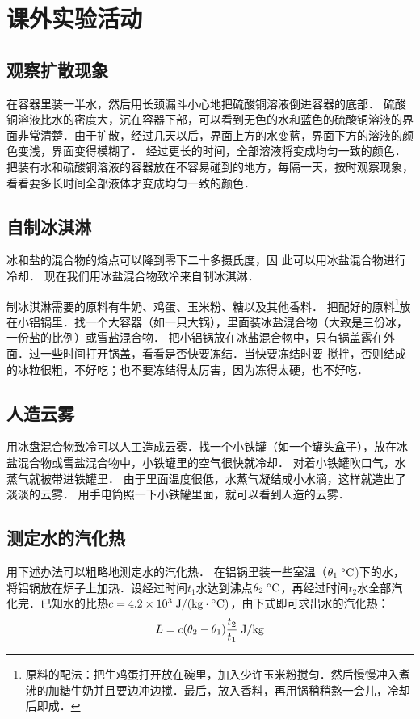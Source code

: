 \chapter{课外实验活动}
\setcounter{section}{0}
\section{观察扩散现象}

在容器里装一半水，然后用长颈漏斗小心地把硫酸铜溶液倒进容器的底部．
硫酸铜溶液比水的密度大，沉在容器下部，可以看到无色的水和蓝色的硫酸铜溶液的界面非常清楚．由于扩散，经过几天以后，界面上方的水变蓝，界面下方的溶液的颜色变浅，界面变得模糊了．
经过更长的时间，全部溶液将变成均匀一致的颜色．把装有水和硫酸铜溶液的容器放在不容易碰到的地方，每隔一天，按时观察现象，看看要多长时间全部液体才变成均匀一致的颜色．

\section{自制冰淇淋}
冰和盐的混合物的熔点可以降到零下二十多摄氏度，因
此可以用冰盐混合物进行冷却．
现在我们用冰盐混合物致冷来自制冰淇淋．

制冰淇淋需要的原料有牛奶、鸡蛋、玉米粉、糖以及其他香料．
把配好的原料\footnote{原料的配法：把生鸡蛋打开放在碗里，加入少许玉米粉搅匀．然后慢慢冲入煮沸的加糖牛奶并且要边冲边搅．最后，放入香料，再用锅稍稍熬一会儿，冷却后即成．}放在小铝锅里．找一个大容器（如一只大锅），里面装冰盐混合物（大致是三份冰，一份盐的比例）或雪盐混合物．
把小铝锅放在冰盐混合物中，只有锅盖露在外面．过一些时间打开锅盖，看看是否快要冻结．当快要冻结时要
搅拌，否则结成的冰粒很粗，不好吃；也不要冻结得太厉害，因为冻得太硬，也不好吃．

\section{人造云雾}
用冰盘混合物致冷可以人工造成云雾．找一个小铁罐（如一个罐头盒子），放在冰盐混合物或雪盐混合物中，小铁罐里的空气很快就冷却．
对着小铁罐吹口气，水蒸气就被带进铁罐里．
由于里面温度很低，水蒸气凝结成小水滴，这样就造出了淡淡的云雾．
用手电筒照一下小铁罐里面，就可以看到人造的云雾．

\section{测定水的汽化热}
用下述办法可以粗略地测定水的汽化热．
在铝锅里装一些室温（$\theta_1 \;{}^\circ\text{C} $)下的水，将铝锅放在炉子上加热．设经过时间$t_1$水达到沸点$\theta_2\;{}^\circ\text{C} $，再经过时间$t_2$水全部汽化完．已知水的比热$c=4.2\times10^3 \;\text{J}/(\text{kg}\cdot{}^\circ\text{C}) $，由下式即可求出水的汽化热：
\[L=c(\theta_2-\theta_1)\frac{t_2}{t_1} \;\text{J}/\text{kg}  \]

